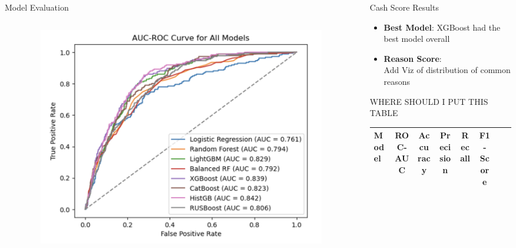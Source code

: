 \documentclass[final]{beamer}
\newlength{\sepwidth}
\newlength{\colwidth}
\newcommand{\separatorcolumn}{\begin{column}{\sepwidth}\end{column}}
\begin{document}
\begin{frame}[t]
\begin{columns}[t]
\begin{column}{\colwidth}
\begin{block}{Model Evaluation}
\begin{columns}
\begin{column}{0.5\textwidth}
\end{column}
\begin{column}{0.5\textwidth}
\begin{center}
      \begin{figure}[H]
        \includegraphics[height=0.2\textheight]{figure/auc_roc_all_models.png}
        \label{fig:accounts_df}
    \end{figure}
\end{center}
\end{column}
\end{columns}
  \end{block}
\end{column}

\separatorcolumn

\begin{column}{\colwidth}

  \begin{exampleblock}{Cash Score Results}
  \begin{itemize}
        \item \textbf{Best Model}: XGBoost had the best model overall
        \item \textbf{Reason Score}: \\
        Add Viz of distribution of common reasons
    \end{itemize}

    WHERE SHOULD I PUT THIS TABLE
    \begin{table}[H]
    \centering
    \begin{tabular}{|l|c|c|c|c|c|c|c|}
        \hline
        Model & ROC-AUC & Accuracy & Precision & Recall & F1-Score \\
        \hline


\end{tabular}
\end{table}
\end{exampleblock}
\end{column}
\end{columns}
\end{frame}
\end{document}
